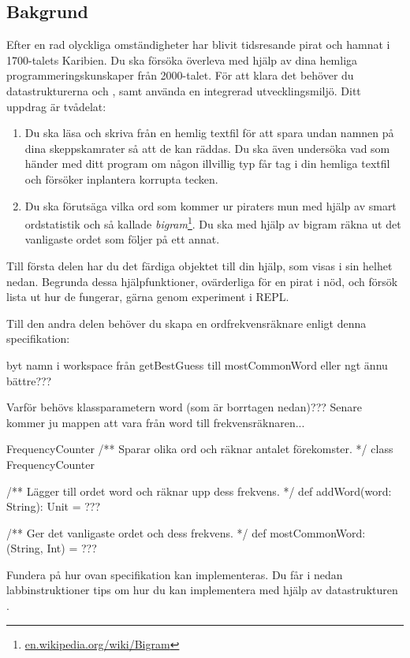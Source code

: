 \subsection{Bakgrund}


Efter en rad olyckliga omständigheter har blivit tidsresande pirat och hamnat i 1700-talets Karibien. Du ska försöka överleva med hjälp av dina hemliga programmeringskunskaper från 2000-talet. För att klara det behöver du datastrukturerna  och , samt använda en integrerad utvecklingsmiljö.
Ditt uppdrag är tvådelat:
\begin{enumerate}
\item Du ska läsa och skriva från en hemlig textfil för att spara undan namnen på dina skeppskamrater så att de kan räddas. Du ska även undersöka vad som händer med ditt program om någon illvillig typ får tag i din hemliga textfil och försöker inplantera korrupta tecken.
\item Du ska förutsäga vilka ord som kommer ur piraters mun med hjälp av smart ordstatistik och så kallade \emph{bigram}\footnote{\href{https://en.wikipedia.org/wiki/Bigram}{en.wikipedia.org/wiki/Bigram}}. Du ska med hjälp av bigram räkna ut det vanligaste ordet som följer på ett annat.  
\end{enumerate}


Till första delen har du det färdiga objektet  till din hjälp, som visas i sin helhet nedan. Begrunda dessa hjälpfunktioner, ovärderliga för en pirat i nöd, och försök lista ut hur de fungerar, gärna genom experiment i REPL.

\noindent Till den andra delen behöver du skapa en ordfrekvensräknare enligt denna specifikation: 

\TODO byt namn i workspace från getBestGuess till mostCommonWord eller ngt ännu bättre???  

\TODO Varför behövs   klassparametern word (som är borrtagen nedan)??? Senare kommer ju mappen att vara från word till frekvensräknaren...

\begin{ScalaSpec}{FrequencyCounter}
  /** Sparar olika ord och räknar antalet förekomster. */
  class FrequencyCounter {
    
    /** Lägger till ordet word och räknar upp dess frekvens. */
    def addWord(word: String): Unit = ???    
    
    /** Ger det vanligaste ordet och dess frekvens. */ 
    def mostCommonWord: (String, Int) =  ???
    
  }
\end{ScalaSpec}
Fundera på hur ovan specifikation kan implementeras. Du får i nedan labbinstruktioner tips om hur du kan implementera  med hjälp av datastrukturen .


